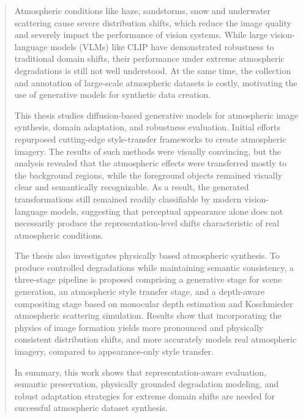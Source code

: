 \begin{abstract}

Atmospheric conditions like haze, sandstorms, snow and underwater scattering cause severe distribution shifts, which reduce the image quality and severely impact the performance of vision systems. While large vision-language models (VLMs) like CLIP have demonstrated robustness to traditional domain shifts, their performance under extreme atmospheric degradations is still not well understood. At the same time, the collection and annotation of large-scale atmospheric datasets is costly, motivating the use of generative models for synthetic data creation.

This thesis studies diffusion-based generative models for atmospheric image synthesis, domain adaptation, and robustness evaluation. Initial efforts repurposed cutting-edge style-transfer frameworks to create atmospheric imagery. The results of such methods were visually convincing, but the analysis revealed that the atmospheric effects were transferred mostly to the background regions, while the foreground objects remained visually clear and semantically recognizable. As a result, the generated transformations still remained readily classifiable by modern vision-language models, suggesting that perceptual appearance alone does not necessarily produce the representation-level shifts characteristic of real atmospheric conditions.

The thesis also investigates physically based atmospheric synthesis. To produce controlled degradations while maintaining semantic consistency, a three-stage pipeline is proposed comprising a generative stage for scene generation, an atmospheric style transfer stage, and a depth-aware compositing stage based on monocular depth estimation and Koschmieder atmospheric scattering simulation. Results show that incorporating the physics of image formation yields more pronounced and physically consistent distribution shifts, and more accurately models real atmospheric imagery, compared to appearance-only style transfer.

In summary, this work shows that representation-aware evaluation, semantic preservation, physically grounded degradation modeling, and robust adaptation strategies for extreme domain shifts are needed for successful atmospheric dataset synthesis.

\end{abstract}
